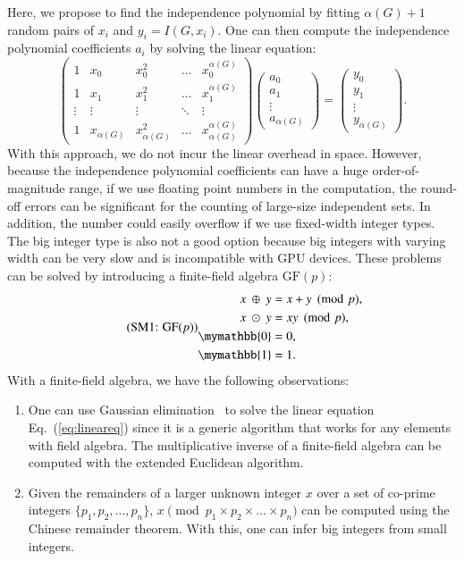\documentclass[onefignum, onetabnum]{siamart190516}
\newcommand{\eqname}[1]{\stepcounter{equation}\tag{\theequation : #1}}
\newcommand{\<}{\langle}
\renewcommand{\>}{\rangle}
\newcommand{\Eq}[1]{Eq.~(\ref{#1})}
\begin{document}
Here, we propose to find the independence polynomial by fitting $\alpha(G)+1$ random pairs of $x_{i}$ and $y_{i} = I(G,x_{i})$. One can then compute the independence polynomial coefficients $a_{i}$ by solving the linear equation: 
\begin{equation}
\left(\begin{matrix}
1 & x_0 & x_0^2 & \ldots & x_0^{\alpha(G)} \\
1 & x_1 & x_1^2 & \ldots & x_1^{\alpha(G)} \\
\vdots & \vdots & \vdots &\ddots & \vdots \\
1 & x_{\alpha(G)} & x_{\alpha(G)}^2 & \ldots & x_{\alpha(G)}^{\alpha(G)}
\end{matrix}\right)
\left(\begin{matrix}
a_0 \\ a_1 \\ \vdots \\ a_{\alpha(G)}
\end{matrix}\right)
= \left(\begin{matrix}
y_0 \\ y_1 \\ \vdots \\ y_{\alpha(G)}
\end{matrix}\right).\label{eq:lineareq}
\end{equation}
With this approach, we do not incur the linear overhead in space. However, because the independence polynomial coefficients can have a huge order-of-magnitude range, if we use floating point numbers in the computation, the round-off errors can be significant for the counting of large-size independent sets.
In addition, the number could easily overflow if we use fixed-width integer types.
The big integer type is also not a good option because big integers with varying width can be very slow and is incompatible with GPU devices. These problems can be solved by introducing a finite-field algebra $\text{GF}(p)$:
\begin{equation}
\eqname{GF$(p)$}
\begin{split}
    x ~\oplus~ y &= x+y\pmod p,\\
    x ~\odot~ y &= xy\pmod p,\\
    \mymathbb{0} &= 0,\\
    \mymathbb{1} &= 1.
\end{split}\label{eq:finitefield}
\end{equation}
With a finite-field algebra, we have the following observations:
\begin{enumerate}
    \item One can use Gaussian elimination~\cite{Golub2013} to solve the linear equation \Eq{eq:lineareq} since it is a generic algorithm that works for any elements with field algebra. The multiplicative inverse of a finite-field algebra can be computed with the extended Euclidean algorithm.
    \item Given the remainders of a larger unknown integer $x$ over a set of co-prime integers $\{p_1, p_2, \ldots, p_n\}$,
    $x \pmod {p_1 \times p_2 \times \ldots \times p_n}$ can be computed using the Chinese remainder theorem. With this, one can infer big integers from small integers.
\end{enumerate}
\end{document}

